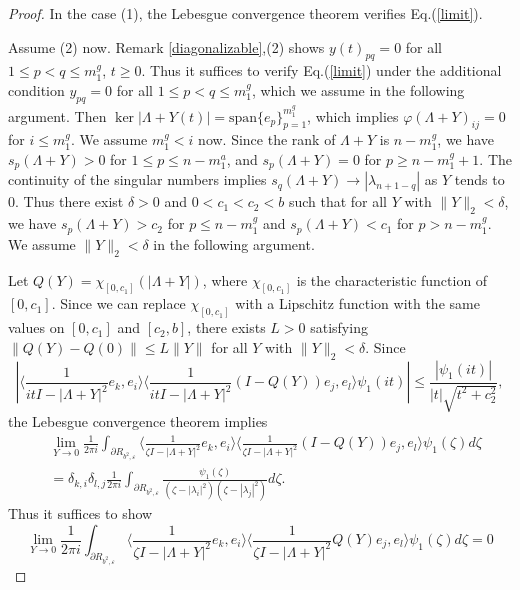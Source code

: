 \documentclass[10pt,a4paper]{amsart}
\newcommand{\inpr}[2]{\langle{#1,#2}\rangle}
\begin{document}
\begin{proof}
In the case (1), the Lebesgue convergence theorem verifies Eq.(\ref{limit}). 

Assume (2) now. 
Remark \ref{diagonalizable},(2) shows $y(t)_{pq}=0$ for all $1\leq p<q\leq m^g_1$, $t\geq 0$. 
Thus it suffices to verify  Eq.(\ref{limit}) under the additional condition $y_{pq}=0$ 
for all $1\leq p<q\leq m^g_1$, which we assume in the following argument.  
Then $\ker|\Lambda+Y(t)|=\mathrm{span}\{e_p\}_{p=1}^{m^g_1}$, which implies $\varphi(\Lambda+Y)_{ij}=0$ 
for $i\leq m^g_1$. 
We assume $m^g_1< i$ now. 
Since the rank of $\Lambda+Y$ is $n-m^g_1$, we have $s_p(\Lambda+Y)>0$ for $1\leq p\leq n-m^a_1$, 
and $s_p(\Lambda+Y)=0$ for $p\geq n-m^g_1+1$. 
The continuity of the singular numbers implies $s_q(\Lambda+Y)\to |\lambda_{n+1-q}|$ as $Y$ tends to 0. 
Thus there exist $\delta>0$ and $0<c_1<c_2<b$ such that for all $Y$ with $\|Y\|_2<\delta$, we have 
$s_p(\Lambda+Y)>c_2$ for $p\leq n-m^g_1$ and $s_p(\Lambda+Y)<c_1$ for $p>n-m^g_1$. 
We assume $\|Y\|_2<\delta$ in the following argument. 

Let $Q(Y)=\chi_{[0,c_1]}(|\Lambda+Y|)$, where $\chi_{[0,c_1]}$ is the characteristic function of $[0,c_1]$. 
Since we can replace $\chi_{[0,c_1]}$ with a Lipschitz function with the same values on $[0,c_1]$ and $[c_2,b]$, 
there exists $L>0$ satisfying $\|Q(Y)-Q(0)\|\leq L\|Y\|$ for all $Y$ with $\|Y\|_2<\delta$. 
Since 
\[|\inpr{\frac{1}{it I-|\Lambda+Y|^2} e_k}{e_i}\inpr{\frac{1}{it I-|\Lambda+Y|^2}(I-Q(Y)) e_j}{e_l}\psi_1(it)|
\leq \frac{|\psi_1(it)|}{|t|\sqrt{t^2+c_2^2}}, \]
the Lebesgue convergence theorem implies  
\begin{align*}
	&\lim_{Y\to 0}
	\frac{1}{2\pi i}\int_{\partial R_{b^2,\varepsilon}} \inpr{\frac{1}{\zeta I-|\Lambda+Y|^2} e_k}{e_i}\inpr{\frac{1}{\zeta I-|\Lambda+Y|^2}(I-Q(Y)) e_j}{e_l}	\psi_1(\zeta)d\zeta\\ \nonumber
	&=\delta_{k,i}\delta_{l,j}\frac{1}{2\pi i}\int_{\partial R_{b^2,\varepsilon}}\frac{\psi_1(\zeta)}{(\zeta-|\lambda_i|^2)(\zeta-|\lambda_j|^2)}d\zeta. 
\end{align*}
Thus it suffices to show 
\[\lim_{Y\to 0}
	\frac{1}{2\pi i}\int_{\partial R_{b^2,\varepsilon}} \inpr{\frac{1}{\zeta I-|\Lambda+Y|^2} e_k}{e_i}\inpr{\frac{1}{\zeta I-|\Lambda+Y|^2}Q(Y)e_j}{e_l}	\psi_1(\zeta)d\zeta=0\]
	

\end{proof}
\end{document}
